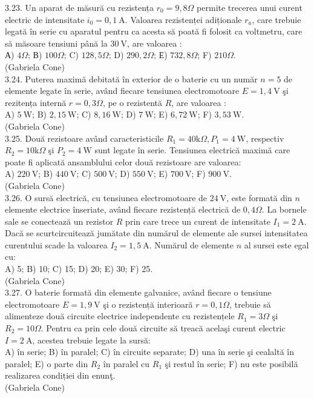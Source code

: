 \documentclass[10pt]{article}
\begin{document}
3.23. Un aparat de măsură cu rezistența $r_{0}=9,8 \Omega$ permite trecerea unui curent electric de intensitate $i_{0}=0,1 \mathrm{~A}$. Valoarea rezistenței adiționale $r_{a}$, care trebuie legată în serie cu aparatul pentru ca acesta să poată fi folosit ca voltmetru, care să măsoare tensiuni până la $30 \mathrm{~V}$, are valoarea :\\ А) $4 \Omega$; В) $100 \Omega$; C) $128,5 \Omega$; D) $290,2 \Omega$; Е) $732,8 \Omega$; F) $210 \Omega$.\\ (Gabriela Cone)\\

3.24. Puterea maximă debitată în exterior de o baterie cu un număr $n=5$ de elemente legate în serie, având fiecare tensiunea electromotoare $E=1,4 \mathrm{~V}$ şi rezitența internă $r=0,3 \Omega$, pe o rezistentă $R$, are valoarea :\\ A) $5 \mathrm{~W}$; B) $2,15 \mathrm{~W}$; C) $8,16 \mathrm{~W}$; D) $7 \mathrm{~W}$; E) $6,72 \mathrm{~W}$; F) $3,53 \mathrm{~W}$.\\ (Gabriela Cone)\\

3.25. Două rezistoare având caracteristicile $R_{1}=40 \mathrm{k} \Omega, P_{1}=4 \mathrm{~W}$, respectiv $R_{2}=10 \mathrm{k} \Omega$ şi $P_{2}=4 \mathrm{~W}$ sunt legate în serie. Tensiunea electrică maximă care poate fi aplicată ansamblului celor două rezistoare are valoarea:\\ A) $220 \mathrm{~V}$; B) $440 \mathrm{~V}$; C) $500 \mathrm{~V}$; D) $550 \mathrm{~V}$; E) $700 \mathrm{~V}$; F) $900 \mathrm{~V}$.\\ (Gabriela Cone)\\

3.26. O sursă electrică, cu tensiunea electromotoare de $24 \mathrm{~V}$, este formată din $n$ elemente electrice înseriate, având fiecare rezistență electrică de $0,4 \Omega$. La bornele sale se conectează un rezistor $R$ prin care trece un curent de intensitate $I_{1}=2 \mathrm{~A}$. Dacă se scurtcircuitează jumătate din numărul de elemente ale sursei intensitatea curentului scade la valoarea $I_{2}=1,5 \mathrm{~A}$. Numărul de elemente $n$ al sursei este egal cu:\\ A) 5; B) 10; C) 15; D) 20; E) 30; F) 25.\\ (Gabriela Cone)\\

3.27. O baterie formată din elemente galvanice, având fiecare o tensiune electromotoare $E=1,9 \mathrm{~V}$ şi o rezistență interioară $r=0,1 \Omega$, trebuie să alimenteze două circuite electrice independente cu rezistențele $R_{1}=3 \Omega$ şi $R_{2}=10 \Omega$. Pentru ca prin cele două circuite să treacă acelaşi curent electric $I=2 \mathrm{~A}$, acestea trebuie legate la sursă:\\ A) în serie; B) în paralel; C) în circuite separate; D) una în serie şi cealaltă în paralel; E) o parte din $R_{2}$ în paralel cu $R_{1}$ şi restul în serie; F) nu este posibilă realizarea condiției din enunţ.\\ (Gabriela Cone)\\
\end{document}
